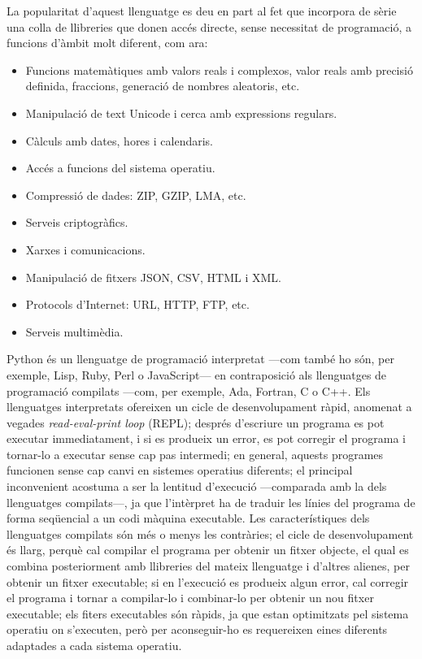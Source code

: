 La popularitat d'aquest llenguatge es deu en part al fet que incorpora de sèrie una colla de llibreries que donen accés directe, sense necessitat de programació, a funcions d'àmbit molt diferent, com ara:
\begin{itemize}
	\item  Funcions matemàtiques amb valors reals i complexos, valor reals amb precisió definida, fraccions, generació de nombres aleatoris, etc.
	\item Manipulació de text Unicode i cerca amb expressions regulars.
	\item Càlculs amb dates, hores i calendaris.
	\item Accés a funcions del sistema operatiu.
	\item Compressió de dades: ZIP, GZIP, LMA, etc.
	\item Serveis criptogràfics.
	\item Xarxes i comunicacions.
	\item Manipulació de fitxers JSON, CSV, HTML i XML.
	\item Protocols d'Internet: URL, HTTP, FTP, etc.
	\item Serveis multimèdia.
\end{itemize}


Python és un llenguatge de programació interpretat ---com també ho són, per exemple,  Lisp, Ruby, Perl o JavaScript--- en contraposició als llenguatges de programació compilats ---com, per exemple, Ada, Fortran, C o C++. Els llenguatges interpretats ofereixen un cicle de desenvolupament ràpid, anomenat a vegades  \textit{read-eval-print loop} (REPL); després d'escriure un programa es pot executar immediatament, i si es produeix  un error, es pot corregir el programa i tornar-lo a executar sense cap pas intermedi; en general, aquests programes funcionen sense cap canvi en  sistemes operatius diferents; el principal inconvenient acostuma a ser la lentitud d'execució ---comparada amb la dels llenguatges compilats---, ja que l'intèrpret ha de traduir les línies del programa de forma seqüencial a un codi màquina executable. Les característiques dels llenguatges compilats són més o menys les contràries; el cicle de desenvolupament és llarg, perquè cal compilar el programa per obtenir un fitxer objecte, el qual es combina posteriorment amb llibreries del mateix llenguatge i d'altres alienes, per obtenir un fitxer executable; si en l'execució es produeix algun error, cal corregir el programa i tornar a compilar-lo i combinar-lo per obtenir un nou fitxer executable; els fiters executables són ràpids, ja que estan optimitzats pel sistema operatiu on s'executen, però per aconseguir-ho  es requereixen eines diferents adaptades a cada sistema operatiu.

